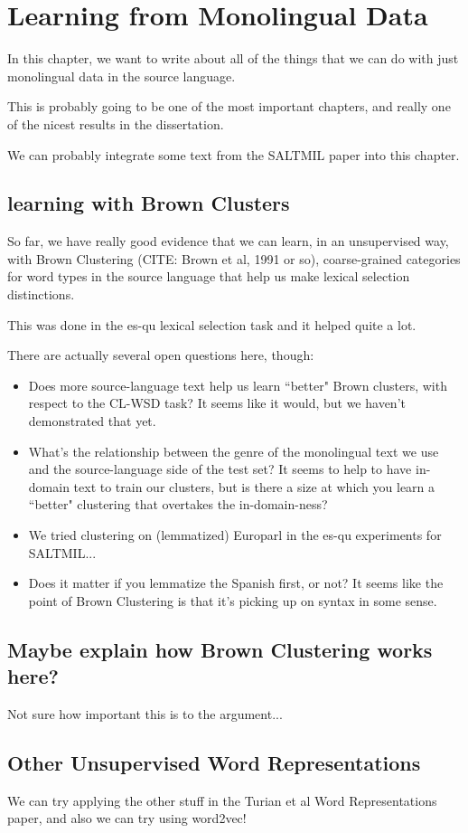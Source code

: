 \chapter{Learning from Monolingual Data}
In this chapter, we want to write about all of the things that we can do with
just monolingual data in the source language.

This is probably going to be one of the most important chapters, and really one
of the nicest results in the dissertation.

We can probably integrate some text from the SALTMIL paper into this chapter.

\section{learning with Brown Clusters}
So far, we have really good evidence that we can learn, in an unsupervised way,
with Brown Clustering (CITE: Brown et al, 1991 or so),
coarse-grained categories for word types in the source language that help us
make lexical selection distinctions.

This was done in the es-qu lexical selection task and it helped quite a lot.

There are actually several open questions here, though:

\begin{itemize}
  \item Does more source-language text help us learn ``better" Brown clusters,
    with respect to the CL-WSD task? It seems like it would, but we haven't
    demonstrated that yet.
  \item What's the relationship between the genre of the monolingual text we
    use and the source-language side of the test set? It seems to help to have
    in-domain text to train our clusters, but is there a size at which you
    learn a ``better" clustering that overtakes the in-domain-ness?
  \item We tried clustering on (lemmatized) Europarl in the es-qu experiments for SALTMIL...
  \item Does it matter if you lemmatize the Spanish first, or not? It seems
    like the point of Brown Clustering is that it's picking up on syntax in
    some sense.
\end{itemize}

\section{Maybe explain how Brown Clustering works here?}
Not sure how important this is to the argument...

\section{Other Unsupervised Word Representations}
We can try applying the other stuff in the Turian et al Word Representations
paper, and also we can try using word2vec!
